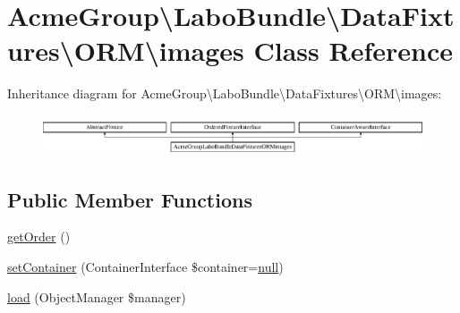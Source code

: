 \hypertarget{class_acme_group_1_1_labo_bundle_1_1_data_fixtures_1_1_o_r_m_1_1images}{\section{Acme\+Group\textbackslash{}Labo\+Bundle\textbackslash{}Data\+Fixtures\textbackslash{}O\+R\+M\textbackslash{}images Class Reference}
\label{class_acme_group_1_1_labo_bundle_1_1_data_fixtures_1_1_o_r_m_1_1images}
}
Inheritance diagram for Acme\+Group\textbackslash{}Labo\+Bundle\textbackslash{}Data\+Fixtures\textbackslash{}O\+R\+M\textbackslash{}images\+:\begin{figure}[H]
\begin{center}
\leavevmode
\includegraphics[height=1.208199cm]{class_acme_group_1_1_labo_bundle_1_1_data_fixtures_1_1_o_r_m_1_1images}
\end{center}
\end{figure}
\subsection*{Public Member Functions}
\begin{DoxyCompactItemize}
\item 
\hyperlink{class_acme_group_1_1_labo_bundle_1_1_data_fixtures_1_1_o_r_m_1_1images_a9f17e99f7ef60705a86b235e5f74750d}{get\+Order} ()
\item 
\hyperlink{class_acme_group_1_1_labo_bundle_1_1_data_fixtures_1_1_o_r_m_1_1images_a770038f9224b885e7d506bdd18a73030}{set\+Container} (Container\+Interface \$container=\hyperlink{validate_8js_afb8e110345c45e74478894341ab6b28e}{null})
\item 
\hyperlink{class_acme_group_1_1_labo_bundle_1_1_data_fixtures_1_1_o_r_m_1_1images_a72bdd20f98d0346263695d6c621860d6}{load} (Object\+Manager \$manager)
\end{DoxyCompactItemize}


